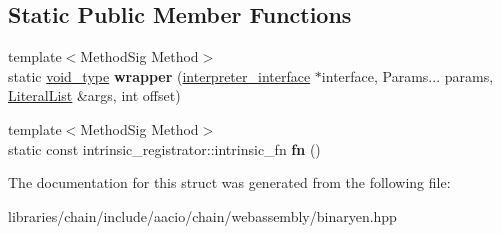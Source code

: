 \subsection*{Static Public Member Functions}
\begin{DoxyCompactItemize}
\item 
\mbox{\label{structaacio_1_1chain_1_1webassembly_1_1binaryen_1_1intrinsic__function__invoker_3_01void_00_01_mfe4bc7950479e99a3f3cb30dae7904e2_a35f4988cdb99a3580acfd146b64c30fc}} 
{\footnotesize template$<$Method\+Sig Method$>$ }\\static \mbox{\hyperlink{structaacio_1_1chain_1_1webassembly_1_1binaryen_1_1void__type}{void\+\_\+type}} {\bfseries wrapper} (\mbox{\hyperlink{structaacio_1_1chain_1_1webassembly_1_1binaryen_1_1interpreter__interface}{interpreter\+\_\+interface}} $\ast$interface, Params... params, \mbox{\hyperlink{classstd_1_1vector}{Literal\+List}} \&args, int offset)
\item 
\mbox{\label{structaacio_1_1chain_1_1webassembly_1_1binaryen_1_1intrinsic__function__invoker_3_01void_00_01_mfe4bc7950479e99a3f3cb30dae7904e2_a22438c687a718e85c8d6858d7f9504a4}} 
{\footnotesize template$<$Method\+Sig Method$>$ }\\static const intrinsic\+\_\+registrator\+::intrinsic\+\_\+fn {\bfseries fn} ()
\end{DoxyCompactItemize}


The documentation for this struct was generated from the following file\+:\begin{DoxyCompactItemize}
\item 
libraries/chain/include/aacio/chain/webassembly/binaryen.\+hpp\end{DoxyCompactItemize}
